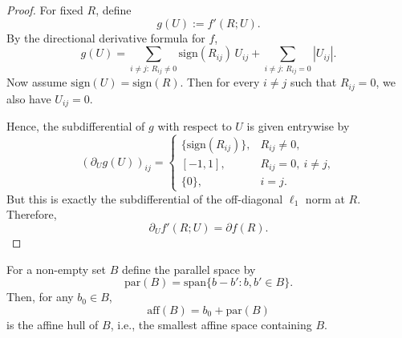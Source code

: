 \documentclass[12pt]{amsart}
\numberwithin{equation}{section}
\numberwithin{equation}{section}
\theoremstyle{plain}
\theoremstyle{definition}
\newcommand{\sign}{\mathrm{sign}}
\begin{document}
\begin{proof}
For fixed $R$, define
\[
g(U):=f'(R;U).
\]
By the directional derivative formula for $f$,
\[
g(U)=\sum_{i\neq j:\,R_{ij}\neq 0}\sign(R_{ij})\,U_{ij}
+\sum_{i\neq j:\,R_{ij}=0}|U_{ij}|.
\]
Now assume $\sign(U)=\sign(R)$. Then for every $i\neq j$ such that $R_{ij}=0$, we also have $U_{ij}=0$.

Hence, the subdifferential of $g$ with respect to $U$ is given entrywise by
\[
(\partial_U g(U))_{ij}=
\begin{cases}
\{\sign(R_{ij})\}, & R_{ij}\neq 0,\\[1mm]
[-1,1], & R_{ij}=0,\ i\neq j,\\[1mm]
\{0\}, & i=j.
\end{cases}
\]
But this is exactly the subdifferential of the off-diagonal $\ell_1$ norm at $R$.
Therefore,
\[
\partial_U f'(R;U)=\partial f(R).
\]
\end{proof}



For a non-empty set $B$ define the parallel space 
by
\[
\mathrm{par}(B) = \mathrm{span}\{b-b'\colon b,b'\in B\}.
\]
Then, for any $b_0\in B$, 
\[
\mathrm{aff}(B) = b_0 + \mathrm{par}(B)
\]
is the affine hull of $B$, i.e., the smallest affine space containing $B$. 
\end{document}
